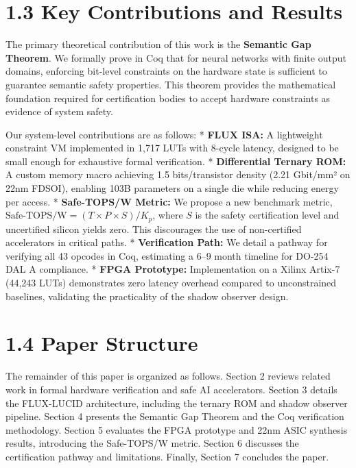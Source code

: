 \documentclass[sigplan,review,anonymous]{acmart}
\begin{document}
\section{1.3 Key Contributions and Results}

The primary theoretical contribution of this work is the \textbf{Semantic Gap Theorem}. We formally prove in Coq that for neural networks with finite output domains, enforcing bit-level constraints on the hardware state is sufficient to guarantee semantic safety properties. This theorem provides the mathematical foundation required for certification bodies to accept hardware constraints as evidence of system safety.

Our system-level contributions are as follows:
*   \textbf{FLUX ISA:} A lightweight constraint VM implemented in 1,717 LUTs with 8-cycle latency, designed to be small enough for exhaustive formal verification.
*   \textbf{Differential Ternary ROM:} A custom memory macro achieving 1.5 bits/transistor density (2.21 Gbit/mm² on 22nm FDSOI), enabling 103B parameters on a single die while reducing energy per access.
*   \textbf{Safe-TOPS/W Metric:} We propose a new benchmark metric, $\text{Safe-TOPS/W} = (T \times P \times S) / K_p$, where $S$ is the safety certification level and uncertified silicon yields zero. This discourages the use of non-certified accelerators in critical paths.
*   \textbf{Verification Path:} We detail a pathway for verifying all 43 opcodes in Coq, estimating a 6–9 month timeline for DO-254 DAL A compliance.
*   \textbf{FPGA Prototype:} Implementation on a Xilinx Artix-7 (44,243 LUTs) demonstrates zero latency overhead compared to unconstrained baselines, validating the practicality of the shadow observer design.

\section{1.4 Paper Structure}

The remainder of this paper is organized as follows. Section 2 reviews related work in formal hardware verification and safe AI accelerators. Section 3 details the FLUX-LUCID architecture, including the ternary ROM and shadow observer pipeline. Section 4 presents the Semantic Gap Theorem and the Coq verification methodology. Section 5 evaluates the FPGA prototype and 22nm ASIC synthesis results, introducing the Safe-TOPS/W metric. Section 6 discusses the certification pathway and limitations. Finally, Section 7 concludes the paper.
\end{document}
